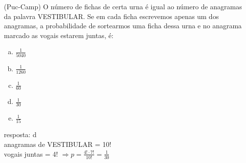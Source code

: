 \begin{ex}
 (Puc-Camp) O número de fichas de certa urna é igual ao número de anagramas da palavra VESTIBULAR. Se em cada ficha escrevemos apenas um dos anagramas, a probabilidade de sortearmos uma ficha dessa urna e no anagrama marcado as vogais estarem juntas, é:
    \begin{enumerate}[(a)]
    \item $\frac{1}{5040}$
    \item $\frac{1}{1260}$
    \item $\frac{1}{60}$
    \item $\frac{1}{30}$
    \item $\frac{1}{15}$
    \end{enumerate}
      \begin{sol}
        resposta: d \\
        anagramas de VESTIBULAR = 10! \\
        vogais juntas = 4! $\Longrightarrow p = \frac{4!\cdot7!}{10!}= \frac{1}{30}$
      \end{sol}
\end{ex}